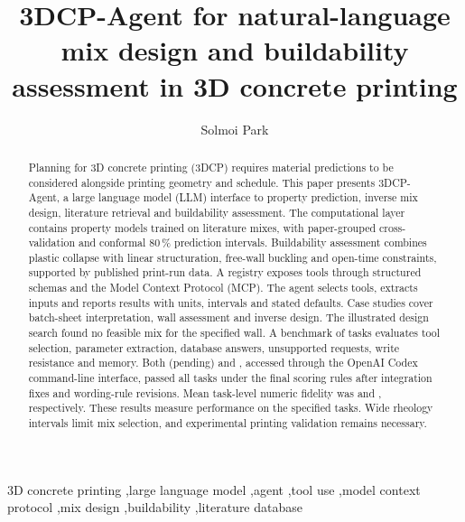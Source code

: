 \documentclass[preprint,12pt]{elsarticle}
\providecommand{\nbenchCxModel}{(pending)}
\begin{document}
\begin{frontmatter}

\title{3DCP-Agent for natural-language mix design and buildability assessment in 3D concrete printing}

\author[skku]{Solmoi Park}
\address[skku]{School of Civil, Architectural Engineering and Landscape Architecture, Sungkyunkwan University, Suwon, Republic of Korea}

\begin{abstract}
Planning for 3D concrete printing (3DCP) requires material predictions to be considered alongside printing geometry and schedule. This paper presents 3DCP-Agent, a large language model (LLM) interface to property prediction, inverse mix design, literature retrieval and buildability assessment. The computational layer contains \nnModels{} property models trained on \nmixes{} literature mixes, with paper-grouped cross-validation and conformal 80\,\% prediction intervals. Buildability assessment combines plastic collapse with linear structuration, free-wall buckling and open-time constraints, supported by published print-run data. A registry exposes \nnTools{} tools through structured schemas and the Model Context Protocol (MCP). The agent selects tools, extracts inputs and reports results with units, intervals and stated defaults. Case studies cover batch-sheet interpretation, wall assessment and inverse design. The illustrated design search found no feasible mix for the specified wall. A benchmark of \nbenchCxN{} tasks evaluates tool selection, parameter extraction, database answers, unsupported requests, write resistance and memory. Both \nbenchCxModel{} and \nbenchCsModel{}, accessed through the OpenAI Codex command-line interface, passed all tasks under the final scoring rules after integration fixes and wording-rule revisions. Mean task-level numeric fidelity was \nbenchCxFidelity{} and \nbenchCsFidelity{}, respectively. These results measure performance on the specified tasks. Wide rheology intervals limit mix selection, and experimental printing validation remains necessary.
\end{abstract}

\begin{keyword}
3D concrete printing \sep large language model \sep agent \sep tool use \sep model context protocol \sep mix design \sep buildability \sep literature database
\end{keyword}
\end{frontmatter}
\end{document}
